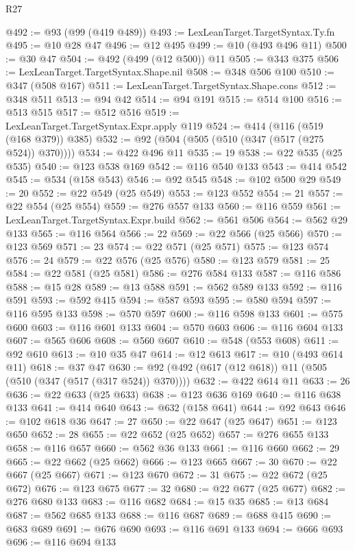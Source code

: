 \begin{lexlean}{R27}
\begin{coremodule}
@492 := @93 (@99 (@419 @489))
@493 := LexLeanTarget.TargetSyntax.Ty.fn
@495 := @10 @28 @47
@496 := @12 @495
@499 := @10 (@493 @496 @11)
@500 := @30 @47
@504 := @492 (@499 (@12 @500)) @11
@505 := @343 @375
@506 := LexLeanTarget.TargetSyntax.Shape.nil
@508 := @348 @506 @100
@510 := @347 (@508 @167)
@511 := LexLeanTarget.TargetSyntax.Shape.cons
@512 := @348 @511
@513 := @94 @42
@514 := @94 @191
@515 := @514 @100
@516 := @513 @515
@517 := @512 @516
@519 := LexLeanTarget.TargetSyntax.Expr.apply @119
@524 := @414 (@116 (@519 (@168 @379)) @385)
@532 := @92 (@504 (@505 (@510 (@347 (@517 (@275 @524)) @370))))
@534 := @422 @496 @11
@535 := 19
@538 := @22 @535 (@25 @535)
@540 := @123 @538 @169
@542 := @116 @540 @133
@543 := @414 @542
@545 := @534 (@158 @543)
@546 := @92 @545
@548 := @102 @500 @29
@549 := 20
@552 := @22 @549 (@25 @549)
@553 := @123 @552
@554 := 21
@557 := @22 @554 (@25 @554)
@559 := @276 @557 @133
@560 := @116 @559
@561 := LexLeanTarget.TargetSyntax.Expr.build
@562 := @561 @506
@564 := @562 @29 @133
@565 := @116 @564
@566 := 22
@569 := @22 @566 (@25 @566)
@570 := @123 @569
@571 := 23
@574 := @22 @571 (@25 @571)
@575 := @123 @574
@576 := 24
@579 := @22 @576 (@25 @576)
@580 := @123 @579
@581 := 25
@584 := @22 @581 (@25 @581)
@586 := @276 @584 @133
@587 := @116 @586
@588 := @15 @28
@589 := @13 @588
@591 := @562 @589 @133
@592 := @116 @591
@593 := @592 @415
@594 := @587 @593
@595 := @580 @594
@597 := @116 @595 @133
@598 := @570 @597
@600 := @116 @598 @133
@601 := @575 @600
@603 := @116 @601 @133
@604 := @570 @603
@606 := @116 @604 @133
@607 := @565 @606
@608 := @560 @607
@610 := @548 (@553 @608)
@611 := @92 @610
@613 := @10 @35 @47
@614 := @12 @613
@617 := @10 (@493 @614 @11)
@618 := @37 @47
@630 := @92 (@492 (@617 (@12 @618)) @11 (@505 (@510 (@347 (@517 (@317 @524)) @370))))
@632 := @422 @614 @11
@633 := 26
@636 := @22 @633 (@25 @633)
@638 := @123 @636 @169
@640 := @116 @638 @133
@641 := @414 @640
@643 := @632 (@158 @641)
@644 := @92 @643
@646 := @102 @618 @36
@647 := 27
@650 := @22 @647 (@25 @647)
@651 := @123 @650
@652 := 28
@655 := @22 @652 (@25 @652)
@657 := @276 @655 @133
@658 := @116 @657
@660 := @562 @36 @133
@661 := @116 @660
@662 := 29
@665 := @22 @662 (@25 @662)
@666 := @123 @665
@667 := 30
@670 := @22 @667 (@25 @667)
@671 := @123 @670
@672 := 31
@675 := @22 @672 (@25 @672)
@676 := @123 @675
@677 := 32
@680 := @22 @677 (@25 @677)
@682 := @276 @680 @133
@683 := @116 @682
@684 := @15 @35
@685 := @13 @684
@687 := @562 @685 @133
@688 := @116 @687
@689 := @688 @415
@690 := @683 @689
@691 := @676 @690
@693 := @116 @691 @133
@694 := @666 @693
@696 := @116 @694 @133

\end{coremodule}
\end{lexlean}
